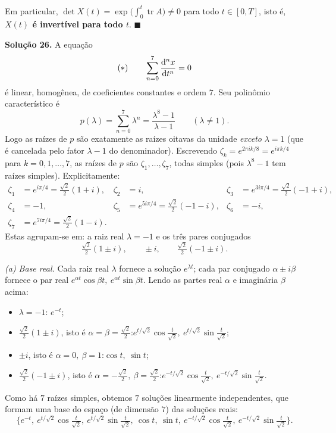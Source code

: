 Em particular, $\det X(t)=\exp\!\big(\int_0^t\operatorname{tr}A\big)\neq0$ para todo $t\in[0,T]$, isto é, \textbf{$X(t)$ é invertível para todo $t$}. \qquad$\blacksquare$


\bigskip\noindent\textbf{Solução 26.}\quad
A equação
\[
    (*)\qquad \sum_{n=0}^{7}\frac{\mathrm{d}^n x}{\mathrm{d} t^n}=0
\]
é linear, homogênea, de coeficientes constantes e ordem $7$. Seu polinômio característico é
\[
    p(\lambda)=\sum_{n=0}^{7}\lambda^n=\frac{\lambda^8-1}{\lambda-1}\qquad(\lambda\neq1).
\]
Logo as raízes de $p$ são exatamente as raízes oitavas da unidade \emph{exceto} $\lambda=1$ (que é cancelada pelo fator $\lambda-1$ do denominador). Escrevendo $\zeta_k=e^{2\pi i k/8}=e^{i\pi k/4}$ para $k=0,1,\dots,7$, as raízes de $p$ são $\zeta_1,\dots,\zeta_7$, todas simples (pois $\lambda^8-1$ tem raízes simples). Explicitamente:
\[
    \begin{aligned}
    \zeta_1&=e^{i\pi/4}=\tfrac{\sqrt2}{2}(1+i), & \zeta_2&=i, & \zeta_3&=e^{3i\pi/4}=\tfrac{\sqrt2}{2}(-1+i),\\
    \zeta_4&=-1, & \zeta_5&=e^{5i\pi/4}=\tfrac{\sqrt2}{2}(-1-i), & \zeta_6&=-i,\\
    \zeta_7&=e^{7i\pi/4}=\tfrac{\sqrt2}{2}(1-i). & & &
    \end{aligned}
\]
Estas agrupam-se em: a raiz real $\lambda=-1$ e os três pares conjugados
\[
    \tfrac{\sqrt2}{2}(1\pm i),\qquad \pm i,\qquad \tfrac{\sqrt2}{2}(-1\pm i).
\]

\emph{(a) Base real.}
Cada raiz real $\lambda$ fornece a solução $e^{\lambda t}$; cada par conjugado $\alpha\pm i\beta$ fornece o par real $e^{\alpha t}\cos\beta t,\ e^{\alpha t}\sin\beta t$. Lendo as partes real $\alpha$ e imaginária $\beta$ acima:
\begin{itemize}
\item $\lambda=-1$: \quad $e^{-t}$;
\item $\tfrac{\sqrt2}{2}(1\pm i)$, isto é $\alpha=\beta=\tfrac{\sqrt2}{2}$:\quad $e^{t/\sqrt2}\cos\tfrac{t}{\sqrt2},\ e^{t/\sqrt2}\sin\tfrac{t}{\sqrt2}$;
\item $\pm i$, isto é $\alpha=0,\ \beta=1$:\quad $\cos t,\ \sin t$;
\item $\tfrac{\sqrt2}{2}(-1\pm i)$, isto é $\alpha=-\tfrac{\sqrt2}{2},\ \beta=\tfrac{\sqrt2}{2}$:\quad $e^{-t/\sqrt2}\cos\tfrac{t}{\sqrt2},\ e^{-t/\sqrt2}\sin\tfrac{t}{\sqrt2}$.
\end{itemize}
Como há $7$ raízes simples, obtemos $7$ soluções linearmente independentes, que formam uma base do espaço (de dimensão $7$) das soluções reais:
\[
    \boxed{\;
    \Big\{
    e^{-t},\
    e^{t/\sqrt2}\cos\tfrac{t}{\sqrt2},\ e^{t/\sqrt2}\sin\tfrac{t}{\sqrt2},\
    \cos t,\ \sin t,\
    e^{-t/\sqrt2}\cos\tfrac{t}{\sqrt2},\ e^{-t/\sqrt2}\sin\tfrac{t}{\sqrt2}
    \Big\}.
    \;}
\]

